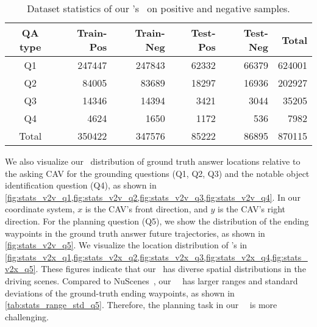 \begin{table}[!t]
\small
\setlength{\tabcolsep}{3.5pt}
\begin{center}
\begin{tabular}{c | rr | rr | r}
  \hline
  \hline
  QA type & Train-Pos & Train-Neg & Test-Pos & Test-Neg & Total \\
  \hline
  \hline
  Q1 & 247447 & 247843 & 62332 & 66379 & 624001 \\
  Q2 &  84005 &  83689 & 18297 & 16936 & 202927 \\
  Q3 &  14346 &  14394 &  3421 &  3044 &  35205 \\
  Q4 &   4624 &   1650 &  1172 &   536 &  7982 \\
  \hline
  Total & 350422 & 347576 & 85222 & 86895 & 870115 
\end{tabular}
\vspace{-10pt}
\caption{
Dataset statistics of our \namedataset's \namexsplit~on positive and negative samples. 
}
\label{tab:stats_v2x_pos_neg}
\end{center}
\vspace{-10pt}
\end{table} 
  
 
We also visualize our \namevsplit~distribution of ground truth answer locations relative to the asking CAV for the grounding questions (Q1, Q2, Q3) and the notable object identification question (Q4), as shown in \cref{fig:stats_v2v_q1,fig:stats_v2v_q2,fig:stats_v2v_q3,fig:stats_v2v_q4}. In our coordinate system, $x$ is the CAV's front direction, and $y$ is the CAV's right direction. For the planning question (Q5), we show the distribution of the ending waypoints in the ground truth answer future trajectories, as shown in \cref{fig:stats_v2v_q5}. We visualize the location distribution of \namedataset's \namexsplit in \cref{fig:stats_v2x_q1,fig:stats_v2x_q2,fig:stats_v2x_q3,fig:stats_v2x_q4,fig:stats_v2x_q5}. These figures indicate that our \namedataset~has diverse spatial distributions in the driving scenes. Compared to NuScenes~\cite{caesar2019nuscenes},
our ~\namedataset~has larger ranges and standard deviations of the ground-truth ending waypoints, as shown in \cref{tab:stats_range_std_q5}. Therefore, the planning task in our ~\namedataset~is more challenging.


